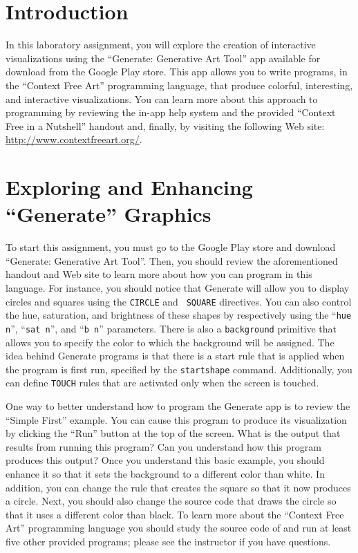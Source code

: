 


\usepackage[compact]{titlesec}



\section*{Introduction}

In this laboratory assignment, you will explore the creation of interactive visualizations using the ``Generate:
Generative Art Tool'' app available for download from the Google Play store. This app allows you to write programs, in
the ``Context Free Art'' programming language, that produce colorful, interesting, and interactive visualizations. You can
learn more about this approach to programming by reviewing the in-app help system and the provided ``Context Free in a
Nutshell'' handout and, finally, by visiting the following Web site: \url{http://www.contextfreeart.org/}.

\section*{Exploring and Enhancing ``Generate'' Graphics}

To start this assignment, you must go to the Google Play store and download ``Generate: Generative Art Tool''.  Then,
you should review the aforementioned handout and Web site to learn more about how you can program in this language.  For
instance, you should notice that Generate will allow you to display circles and squares using the {\tt CIRCLE} and {\tt
SQUARE} directives.  You can also control the hue, saturation, and brightness of these shapes by respectively using the
``{\tt hue n}'', ``{\tt sat n}'', and ``{\tt b n}'' parameters. There is also a {\tt background} primitive that allows
you to specify the color to which the background will be assigned. The idea behind Generate programs is that there is a
start rule that is applied when the program is first run, specified by the {\tt startshape} command.  Additionally, you
can define {\tt TOUCH} rules that are activated only when the screen is touched.

One way to better understand how to program the Generate app is to review the ``Simple First'' example.  You can cause
this program to produce its visualization by clicking the ``Run'' button at the top of the screen. What is the output
that results from running this program? Can you understand how this program produces this output? Once you understand
this basic example, you should enhance it so that it sets the background to a different color than white. In addition,
you can change the rule that creates the square so that it now produces a circle. Next, you should also change the
source code that draws the circle so that it uses a different color than black. To learn more about the ``Context Free
Art'' programming language you should study the source code of and run at least five other provided programs; please see
the instructor if you have questions.

